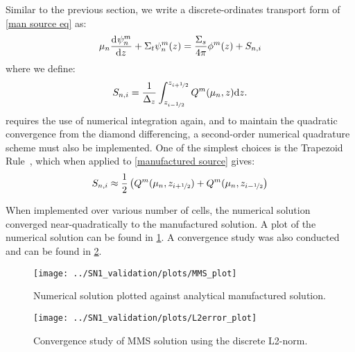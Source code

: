 \documentclass{NE515}
\theoremstyle{definition}
\begin{document}
    Similar to the previous section, we write a discrete-ordinates transport form of \cref{man source eq} as:
    \begin{equation}
        \mu_n \dv[]{\psi_{n}^m}{z}+\Sigma_t \psi_n ^m (z)=\frac{\Sigma_s}{4\pi}\phi^m(z) + S_{n,i}
    \end{equation}
    where we define:
    \begin{equation}
        \label{manufactured source}
        S_{n,i}=\frac{1}{\Delta _z}\int_{z_{i-\nicefrac{1}{2}}}^{z_{i+\nicefrac{1}{2}}}Q^m(\mu_n,z)\dd z.
    \end{equation}
     requires the use of numerical integration again, and to maintain the quadratic convergence from the diamond differencing, a second-order numerical quadrature scheme must also be implemented.
    One of the simplest choices is the Trapezoid Rule~\cite{gezerlisNumericalMethodsPhysicsa}, which when applied to \cref{manufactured source} gives:
    \begin{equation}
        S_{n,i}\approx\frac{1}{2}\left( Q^m(\mu_n,z_{i+\nicefrac{1}{2}})+Q^m(\mu_n,z_{i-\nicefrac{1}{2}} \right)
    \end{equation}

    When implemented over various number of cells, the numerical solution converged near-quadratically to the manufactured solution.
    A plot of the numerical solution can be found in \cref{true-solution-convergence}.
    A convergence study was also conducted and can be found in \cref{convergence-study}.


    \begin{figure}[!htb]
        \centering
        \texttt{[image: ../SN1\_validation/plots/MMS\_plot]}
        \caption{Numerical solution plotted against analytical manufactured solution.}
        \label{true-solution-convergence}
    \end{figure}

    \begin{figure}[!htb]
        \centering
        \texttt{[image: ../SN1\_validation/plots/L2error\_plot]}
        \caption{Convergence study of MMS solution using the discrete L2-norm.}
        \label{convergence-study}
    \end{figure}

    \clearpage
\end{document}

